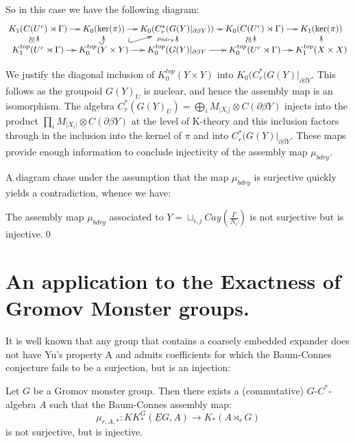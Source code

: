 So in this case we have the following diagram:
\begin{equation*}
\xymatrix@=0.7em{
 K_{1}(C(U^{c})\rtimes \Gamma) \ar[r] & K_{0}(\ker (\pi)) \ar[r]& K_{0}(C^{*}_{r}(G(Y)|_{\partial\beta Y})) \ar[r]& K_{0}(C(U^{c})\rtimes \Gamma)\ar[r] & K_{1}(\ker (\pi))  \\
 K_{1}^{top}(U^{c}\rtimes \Gamma) \ar[r] \ar[u]^{\ucong}& K_{0}^{top}(Y \times Y) \ar[r]\ar@{^{(}->}[u]\ar@{^{(}->}[ru]& K_{0}^{top}(G(Y)|_{\partial\beta Y} \ar[r]\ar[u]^{\mu_{bdry}}& K_{0}^{top}(U^{c}\rtimes \Gamma) \ar[r]\ar[u]^{\ucong}& K_{1}^{top}(X \times X)\ar[u]
}
\end{equation*}

\begin{remark}
We justify the diagonal inclusion of $K_{0}^{top}(Y \times Y)$ into $K_{0}(C^{*}_{r}(G(Y)|_{\partial\beta Y}$. This follows as the groupoid $G(Y)_{U}$ is nuclear, and hence the assembly map is an isomorphism.   The algebra $C^{*}_{r}(G(Y)_{U})= \bigoplus_{i}M_{\vert X_{i}\vert} \otimes C(\partial\beta Y)$ injects into the product $\prod_{i} M_{\vert X_{i}\vert} \otimes C(\partial\beta Y)$ at the level of K-theory and this inclusion factors through in the inclusion into the kernel of $\pi$ and into $C^{*}_{r}(G(Y)|_{\partial\beta Y}$. These maps provide enough information to conclude injectivity of the assembly map $\mu_{bdry}$.
\end{remark}

A diagram chase under the assumption that the map $\mu_{bdry}$ is surjective quickly yields a contradiction, whence we have:

\begin{corollary}
The assembly map $\mu_{bdry}$ associated to $Y=\sqcup_{i,j}Cay(\frac{\Gamma}{N_{i}})$ is not surjective but is injective.\qed
\end{corollary}

\chapter{An application to the Exactness of Gromov Monster groups.}

It is well known \cite{MR1911663,explg1} that any group that contains a coarsely embedded expander does not have Yu's property A and admits coefficients for which the Baum-Connes conjecture fails to be a surjection, but is an injection:

\begin{theorem}\label{Thm:IT1}
Let $G$ be a Gromov monster group. Then there exists a (commutative) $G$-$C^{*}$-algebra $A$ such that the Baum-Connes assembly map:
\begin{equation*}
\mu_{r,A,*}: KK^{G}_{*}(\underline{E}G, A) \rightarrow K_{*}(A\rtimes_{r}G)
\end{equation*}
is not surjective, but is injective.
\end{theorem}

